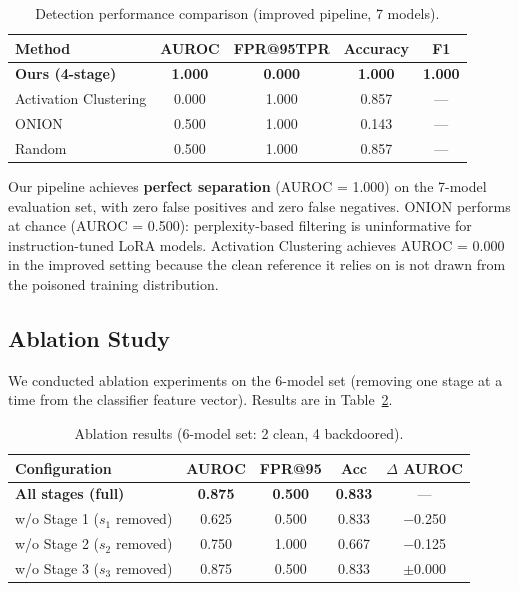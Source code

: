 \documentclass[11pt,a4paper]{article}
\begin{document}
\begin{table}[h]
\centering
\caption{Detection performance comparison (improved pipeline, 7 models).}
\label{tab:baselines}
\begin{tabular}{lcccc}
\toprule
\textbf{Method} & \textbf{AUROC} & \textbf{FPR@95TPR} & \textbf{Accuracy} & \textbf{F1} \\
\midrule
\textbf{Ours (4-stage)} & \textbf{1.000} & \textbf{0.000} & \textbf{1.000} & \textbf{1.000} \\
\midrule
Activation Clustering   & 0.000          & 1.000              & 0.857             & --- \\
ONION                   & 0.500          & 1.000              & 0.143             & --- \\
Random                  & 0.500          & 1.000              & 0.857             & --- \\
\bottomrule
\end{tabular}
\end{table}

Our pipeline achieves \textbf{perfect separation} (AUROC = 1.000) on the
7-model evaluation set, with zero false positives and zero false negatives.
ONION performs at chance (AUROC = 0.500): perplexity-based filtering is
uninformative for instruction-tuned LoRA models. Activation Clustering
achieves AUROC = 0.000 in the improved setting because the clean reference
it relies on is not drawn from the poisoned training distribution.

\subsection{Ablation Study}
\label{sec:ablation}

We conducted ablation experiments on the 6-model set (removing one stage at a
time from the classifier feature vector). Results are in Table~\ref{tab:ablation}.

\begin{table}[h]
\centering
\caption{Ablation results (6-model set: 2 clean, 4 backdoored).}
\label{tab:ablation}
\begin{tabular}{lcccc}
\toprule
\textbf{Configuration} & \textbf{AUROC} & \textbf{FPR@95} & \textbf{Acc} & $\Delta$ AUROC \\
\midrule
\textbf{All stages (full)}  & \textbf{0.875} & \textbf{0.500} & \textbf{0.833} & --- \\
\midrule
w/o Stage 1 ($s_1$ removed) & 0.625 & 0.500 & 0.833 & $-$0.250 \\
w/o Stage 2 ($s_2$ removed) & 0.750 & 1.000 & 0.667 & $-$0.125 \\
w/o Stage 3 ($s_3$ removed) & 0.875 & 0.500 & 0.833 & $\pm$0.000 \\
\bottomrule
\end{tabular}
\end{table}
\end{document}
